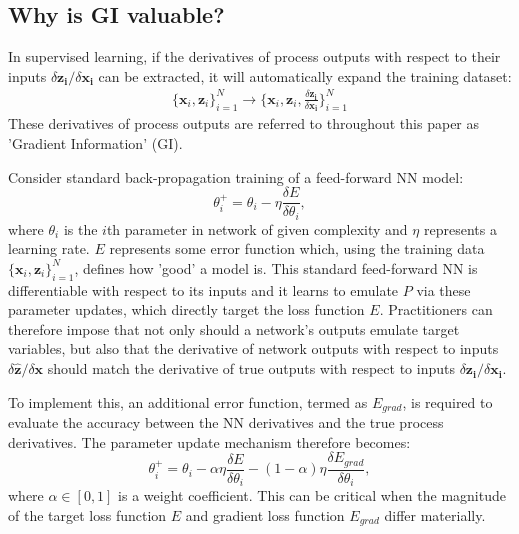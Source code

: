 \documentclass{article}
\begin{document}
\subsection{Why is GI valuable?}
\label{grad_val}
In supervised learning, if the derivatives of process outputs with respect to their inputs $\delta \mathbf{z_i}/\delta \mathbf{x_i}$ can be extracted, it will automatically expand the training dataset:
\begin{align*}
    \{\mathbf{x}_i, \mathbf{z}_i\}_{i=1}^N \rightarrow \{\mathbf{x}_i, \mathbf{z}_i, \frac{\delta \mathbf{z_i}}{\delta \mathbf{x_i}}\}_{i=1}^N
\end{align*}
These derivatives of process outputs are referred to throughout this paper as 'Gradient Information' (GI).

Consider standard back-propagation training of a feed-forward NN model: 
\begin{equation}
    \label{NN_update}
	\theta_i^+ = \theta_i - \eta \frac{\delta E}{\delta \theta_i},
\end{equation}
where $\theta_i$ is the $i$th parameter in network of given complexity and $\eta$ represents a learning rate. $E$ represents some error function which, using the training data $\{\mathbf{x}_i, \mathbf{z}_i\}_{i=1}^N$, defines how 'good' a model is. This standard feed-forward NN is differentiable with respect to its inputs and it learns to emulate $P$ via these parameter updates, which directly target the loss function $E$. Practitioners can therefore impose that not only should a network's outputs emulate target variables, but also that the derivative of network outputs with respect to inputs $\delta \mathbf{\hat{z}}/\delta \mathbf{x}$ should match the derivative of true outputs with respect to inputs $\delta \mathbf{z_i}/\delta \mathbf{x_i}$.

To implement this, an additional error function, termed as $E_{grad}$, is required to evaluate the accuracy between the NN derivatives and the true process derivatives. The parameter update mechanism therefore becomes:
\begin{equation}
    \label{NN_update_w_grad}
	\theta_i^+ = \theta_i - \alpha \eta \frac{\delta E}{\delta \theta_i} - (1-\alpha) \eta \frac{\delta E_{grad}}{\delta \theta_i},
\end{equation}
where $\alpha \in [0,1]$ is a weight coefficient. This can be critical when the magnitude of the target loss function $E$ and gradient loss function $E_{grad}$ differ materially. 
\end{document}
